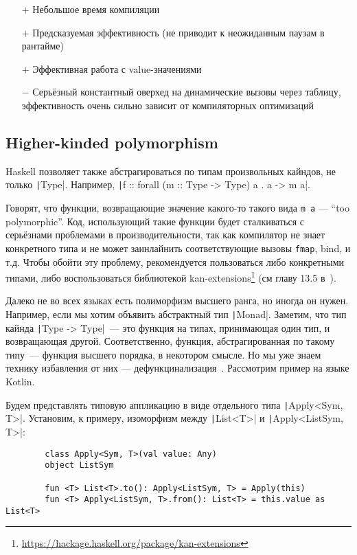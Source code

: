 \documentclass[12pt]{article}
\newcommand{\positive}{$+$} %
\newcommand{\negative}{{\color{red} $-$}} %
\begin{document}
    \begin{itemize}
        \item[\positive] Небольшое время компиляции
        \item[\positive] Предсказуемая эффективность (не приводит к неожиданным паузам в рантайме)
        \item[\positive] Эффективная работа с value-значениями
        \item[\negative] Серьёзный константный оверхед на динамические вызовы через таблицу, эффективность очень сильно зависит от компиляторных оптимизаций
    \end{itemize}

    \subsection{Higher-kinded polymorphism}

    Haskell позволяет также абстрагироваться по типам произвольных кайндов, не только \texttt|Type|.
    Например, \texttt|f :: forall (m :: Type -> Type) a . a -> m a|.

    Говорят, что функции, возвращающие значение какого-то такого вида \texttt{m a} --- ``too polymorphic''.
    Код, использующий такие функции будет сталкиваться с серьёзнами проблемами в производительности, так как компилятор не знает конкретного типа и не может заинлайнить соответствующие вызовы \texttt{fmap}, bind, и т.д.
    Чтобы обойти эту проблему, рекомендуется пользоваться либо конкретными типами, либо воспользоваться библиотекой kan-extensions\footnote{\url{https://hackage.haskell.org/package/kan-extensions}} (см главу 13.5 в~\cite{maguire-types}).


    Далеко не во всех языках есть полиморфизм высшего ранга, но иногда он нужен.
    Например, если мы хотим объявить абстрактный тип \texttt|Monad|.
    Заметим, что тип кайнда \texttt|Type -> Type|~--- это функция на типах, принимающая один тип, и возвращающая другой.
    Соответственно, функция, абстрагированная по такому типу~--- функция высшего порядка, в некотором смысле.
    Но мы уже знаем технику избавления от них --- дефункцинализация~\cite{defunctionalization-slides}.
    Рассмотрим пример на языке Kotlin.

    Будем представлять типовую аппликацию в виде отдельного типа \texttt|Apply<Sym, T>|.
    Установим, к примеру, изоморфизм между \texttt|List<T>| и \texttt|Apply<ListSym, T>|:
    \begin{verbatim}
        class Apply<Sym, T>(val value: Any)
        object ListSym

        fun <T> List<T>.to(): Apply<ListSym, T> = Apply(this)
        fun <T> Apply<ListSym, T>.from(): List<T> = this.value as List<T>
    \end{verbatim}
\end{document}

